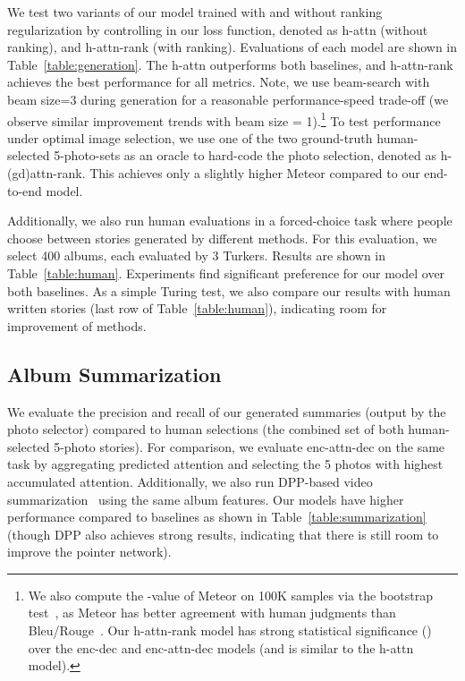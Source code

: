 We test two variants of our model trained with and without ranking regularization by controlling  in our loss function, denoted as h-attn (without ranking), and h-attn-rank (with ranking).
Evaluations of each model are shown in Table~\ref{table:generation}.
The h-attn outperforms both baselines, and h-attn-rank achieves the best performance for all metrics.
Note, we use beam-search with beam size=3 during generation for a reasonable performance-speed trade-off (we observe similar improvement trends with beam size = 1).\footnote{We also compute the -value of Meteor on 100K samples via the bootstrap test~\cite{efron1994introduction}, as Meteor has better agreement with human judgments than Bleu/Rouge~\cite{huang2016visual}.
Our h-attn-rank model has strong statistical significance () over the enc-dec and enc-attn-dec models (and is similar to the h-attn model).}
To test performance under optimal image selection, we use one of the two ground-truth human-selected 5-photo-sets as an oracle to hard-code the photo selection, denoted as h-(gd)attn-rank.
This achieves only a slightly higher Meteor compared to our end-to-end model.

Additionally, we also run human evaluations in a forced-choice task where people choose between stories generated by different methods.
For this evaluation, we select 400 albums, each evaluated by 3 Turkers. Results are shown in Table~\ref{table:human}. 
Experiments find significant preference for our model over both baselines. As a simple Turing test, we also compare our results with human written stories (last row of Table~\ref{table:human}), indicating room for improvement of methods.


\subsection{Album Summarization}
We evaluate the precision and recall of our generated summaries (output by the photo selector) compared to human selections (the combined set of both human-selected 5-photo stories). 
For comparison, we evaluate enc-attn-dec on the same task by aggregating predicted attention and selecting the 5 photos with highest accumulated attention.
Additionally, we also run DPP-based video summarization~\cite{kulesza2012determinantal} using the same album features.
Our models have higher performance compared to baselines as shown in Table~\ref{table:summarization} (though DPP also achieves strong results, indicating that there is still room to improve the pointer network).

